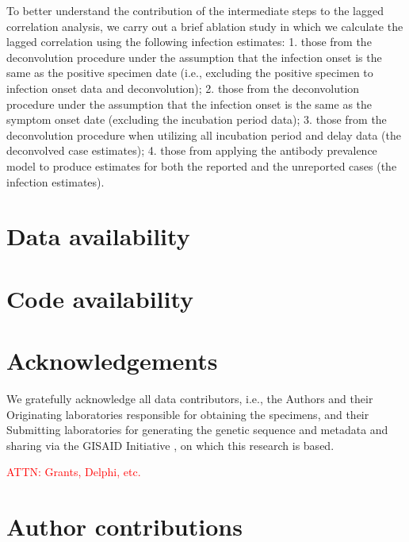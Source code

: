 \documentclass{article}
\newcommand{\attn }[1]{\textcolor{red}{ATTN: #1}}
\begin{document}
To better understand the contribution of the intermediate steps to the lagged
correlation analysis, we carry out a brief ablation study in which we calculate
the lagged correlation using the following infection estimates: 1. those from
the deconvolution procedure under the assumption that the infection onset is the
same as the positive specimen date (i.e., excluding the positive specimen to
infection onset data and deconvolution); 2. those from the deconvolution
procedure under the assumption that the infection onset is the same as the
symptom onset date (excluding the incubation period data); 3. those from the
deconvolution procedure when utilizing all incubation period and delay data (the
deconvolved case estimates); 4. those from applying the antibody prevalence
model to produce estimates for both the reported and the unreported cases (the
infection estimates).

\section*{Data availability}
\section*{Code availability}

\clearpage





\section*{Acknowledgements}

We gratefully acknowledge all data contributors, i.e., the Authors and their
Originating laboratories responsible for obtaining the specimens, and their
Submitting laboratories for generating the genetic sequence and metadata and
sharing via the GISAID Initiative \citep{elbe2017data}, on which this research
is based.

\attn{Grants, Delphi, etc.}

\section*{Author contributions}
\end{document}
